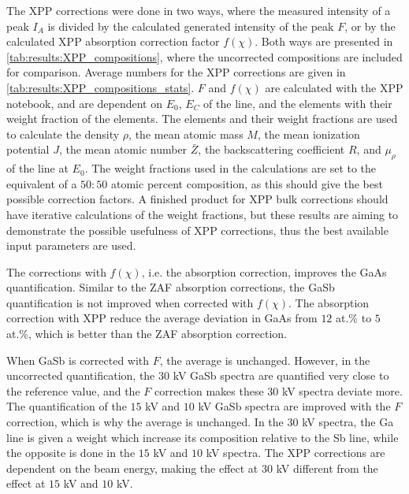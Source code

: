 The XPP corrections were done in two ways, where the measured intensity of a peak $I_A$ is divided by the calculated generated intensity of the peak $F$, or by the calculated XPP absorption correction factor $f(\chi)$.
Both ways are presented in \cref{tab:results:XPP_compositions}, where the uncorrected compositions are included for comparison.
Average numbers for the XPP corrections are given in \cref{tab:results:XPP_compositions_stats}.
$F$ and $f(\chi)$ are calculated with the XPP notebook, and are dependent on $E_0$, $E_C$ of the line, and the elements with their weight fraction of the elements.
The elements and their weight fractions are used to calculate the density $\rho$, the mean atomic mass $M$, the mean ionization potential $J$, the mean atomic number $\bar{Z}$, the backscattering coefficient $R$, and $\mu_\rho$ of the line at $E_0$.
The weight fractions used in the calculations are set to the equivalent of a $50:50$ atomic percent composition, as this should give the best possible correction factors.
A finished product for XPP bulk corrections should have iterative calculations of the weight fractions, but these results are aiming to demonstrate the possible usefulness of XPP corrections, thus the best available input parameters are used.


The corrections with $f(\chi)$, i.e. the absorption correction, improves the GaAs quantification.
Similar to the ZAF absorption corrections, the GaSb quantification is not improved when corrected with $f(\chi)$.
The absorption correction with XPP reduce the average deviation in GaAs from $12$ at.\% to $5$ at.\%, which is better than the ZAF absorption correction.

When GaSb is corrected with $F$, the average is unchanged.
However, in the uncorrected quantification, the $30$ kV GaSb spectra are quantified very close to the reference value, and the $F$ correction makes these $30$ kV spectra deviate more.
The quantification of the $15$ kV and $10$ kV GaSb spectra are improved with the $F$ correction, which is why the average is unchanged.
In the $30$ kV spectra, the Ga line is given a weight which increase its composition relative to the Sb line, while the opposite is done in the $15$ kV and $10$ kV spectra.
The XPP corrections are dependent on the beam energy, making the effect at $30$ kV different from the effect at $15$ kV and $10$ kV.


